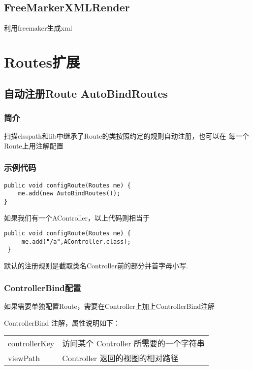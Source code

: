 \documentclass{scrartcl}
\begin{document}
\subsection{FreeMarkerXMLRender}
\label{sec-3-6}

利用freemaker生成xml
\section{Routes扩展}
\label{sec-4}
\subsection{自动注册Route AutoBindRoutes}
\label{sec-4-1}
\subsubsection{简介}
\label{sec-4-1-1}

    扫描clsspath和lib中继承了Route的类按照约定的规则自动注册，也可以在
    每一个Route上用注解配置
\subsubsection{示例代码}
\label{sec-4-1-2}


\begin{verbatim}
public void configRoute(Routes me) {
    me.add(new AutoBindRoutes());
}
\end{verbatim}
    如果我们有一个AController，以上代码则相当于

\begin{verbatim}
public void configRoute(Routes me) {
     me.add("/a",AController.class);
 }
\end{verbatim}
    默认的注册规则是截取类名Controller前的部分并首字母小写.
\subsubsection{ControllerBind配置}
\label{sec-4-1-3}

    如果需要单独配置Route，需要在Controller上加上ControllerBind注解

    ControllerBind 注解，属性说明如下：

\begin{tabular}{ll}
 controllerKey  &  访问某个 Controller 所需要的一个字符串  \\
 viewPath       &  Controller 返回的视图的相对路径         \\
\end{tabular}
\end{document}
